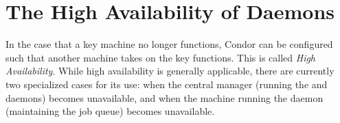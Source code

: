 \section{\label{sec:high-availability}The High Availability of Daemons} 


In the case that a key machine no longer functions,
Condor can be configured such that another machine takes on
the key functions.
This is called \emph{High Availability}.
While high availability is generally applicable,
there are currently two specialized cases for its use:
when the central manager 
(running the  and  daemons)
becomes unavailable,
and when the machine running the 
daemon (maintaining the job queue) becomes unavailable.





